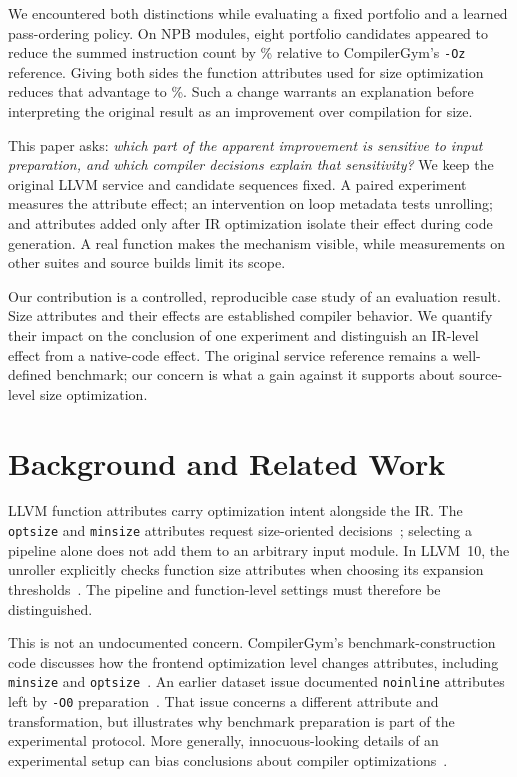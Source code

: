 \documentclass[conference,a4paper]{IEEEtran}
\begin{document}
We encountered both distinctions while evaluating a fixed portfolio
and a learned pass-ordering policy. On \NpbCount{} NPB modules, eight
portfolio candidates appeared to reduce the summed instruction count
by \NpbPlainIcGain\% relative to CompilerGym's \texttt{-Oz} reference.
Giving both sides the function attributes used for size optimization
reduces that advantage to \NpbAttrIcGain\%. Such a change warrants an
explanation before interpreting the original result as an improvement
over compilation for size.

This paper asks: \emph{which part of the apparent improvement is
sensitive to input preparation, and which compiler decisions explain
that sensitivity?} We keep the original LLVM service and candidate
sequences fixed. A paired experiment measures the attribute effect;
an intervention on loop metadata tests unrolling; and attributes added
only after IR optimization isolate their effect during code generation.
A real function makes the mechanism visible, while measurements on
other suites and source builds limit its scope.

Our contribution is a controlled, reproducible case study of an
evaluation result. Size attributes and their effects are established
compiler behavior. We quantify their impact on the conclusion of one
experiment and distinguish an IR-level effect from a native-code effect.
The original service reference remains a well-defined benchmark; our
concern is what a gain against it supports about source-level size
optimization.

\section{Background and Related Work}
LLVM function attributes carry optimization intent alongside the IR.
The \texttt{optsize} and \texttt{minsize} attributes request size-oriented
decisions~\cite{llvmattrs}; selecting a pipeline alone does not add them
to an arbitrary input module. In LLVM~10, the unroller explicitly
checks function size attributes when choosing its expansion
thresholds~\cite{llvmunroll}. The pipeline and function-level settings
must therefore be distinguished.

This is not an undocumented concern. CompilerGym's benchmark-construction
code discusses how the frontend optimization level changes attributes,
including \texttt{minsize} and \texttt{optsize}~\cite{cginput}.
An earlier dataset issue documented \texttt{noinline} attributes left
by \texttt{-O0} preparation~\cite{cgissue}. That issue concerns a
different attribute and transformation, but illustrates why benchmark
preparation is part of the experimental protocol. More generally,
innocuous-looking details of an experimental setup can bias conclusions
about compiler optimizations~\cite{mytkowicz}.
\end{document}
